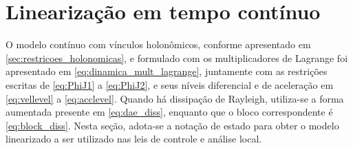 





\section{Linearização em tempo contínuo}
O modelo contínuo com vínculos holonômicos, conforme apresentado em
\eqref{sec:restricoes_holonomicas},
e formulado com os multiplicadores de Lagrange foi apresentado em
\eqref{eq:dinamica_mult_lagrange},
juntamente com as restrições escritas de
\eqref{eq:PhiJ1} a \eqref{eq:PhiJ2},
e seus níveis diferencial e de aceleração em
\eqref{eq:vellevel} a \eqref{eq:acclevel}.
Quando há dissipação de Rayleigh, utiliza-se a forma aumentada presente em
\eqref{eq:dae_diss},
enquanto que o bloco correspondente é
\eqref{eq:block_diss}.
Nesta seção, adota-se a notação de estado para obter o modelo linearizado a ser utilizado nas leis de controle e análise local.

